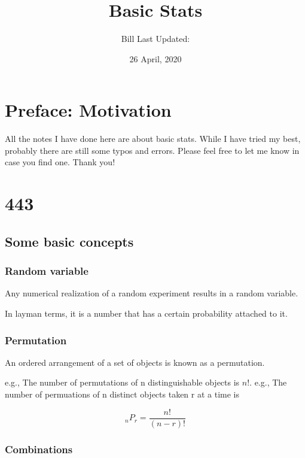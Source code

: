 \documentclass[]{book}
\title{Basic Stats}
\author{Bill Last Updated:}
\date{26 April, 2020}
\begin{document}
\maketitle

{
\setcounter{tocdepth}{1}
\tableofcontents
}
\hypertarget{my-section}{%
\chapter*{Preface: Motivation}\label{my-section}}

All the notes I have done here are about basic stats. While I have tried my best, probably there are still some typos and errors. Please feel free to let me know in case you find one. Thank you!

\hypertarget{section}{%
\chapter{443}\label{section}}

\hypertarget{some-basic-concepts}{%
\section{Some basic concepts}\label{some-basic-concepts}}

\hypertarget{random-variable}{%
\subsection{Random variable}\label{random-variable}}

Any numerical realization of a random experiment results in a random variable.

In layman terms, it is a number that has a certain probability attached to it.

\hypertarget{permutation}{%
\subsection{Permutation}\label{permutation}}

An ordered arrangement of a set of objects is known as a permutation.

e.g., The number of permutations of n distinguishable objects is \(n!\).
e.g., The number of permuations of n distinct objects taken r at a time is

\[_{n}P_r=\frac{n!}{(n-r)!}\]

\hypertarget{combinations}{%
\subsection{Combinations}\label{combinations}}
\end{document}
